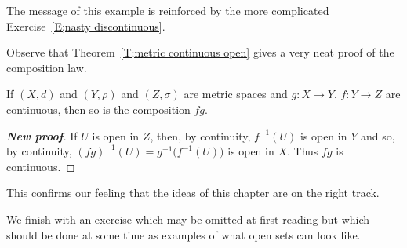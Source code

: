 The message of this example is reinforced by the more complicated Exercise~\ref{E;nasty discontinuous}. 

Observe that Theorem~\ref{T;metric continuous open} gives a very neat proof of the composition law.

\begin{theorem}\label{New proof composition}  
If $(X,d)$ and $(Y,\rho)$
and $(Z,\sigma)$ are metric spaces and $g:X\rightarrow Y$, $f:Y\rightarrow Z$
are continuous, 
then so is the composition $fg$.
\end{theorem}
\begin{proof}[\bf New proof] If $U$ is open in $Z$, then, by continuity, $f^{-1}(U)$ is open in $Y$ and so, by continuity, $(fg)^{-1}(U)=g^{-1}\big(f^{-1}(U)\big)$ is open in $X$. Thus $fg$ is continuous. 
\end{proof}

This confirms our feeling that the ideas of this chapter
are on the right track.

We finish with an exercise which may be omitted
at first reading but which should be done at some time
as examples of what open sets can look like.



